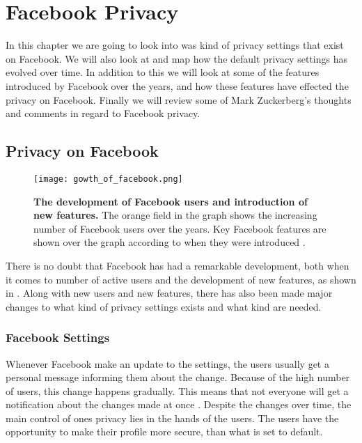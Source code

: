 \chapter{Facebook Privacy}
\label{chp:defaultprivacysettings} 

In this chapter we are going to look into was kind of privacy settings that exist on Facebook. We will also look at and map how the default privacy settings has evolved over time. In addition to this we will look at some of the features introduced by Facebook over the years, and how these features have effected the privacy on Facebook. Finally we will review some of Mark Zuckerberg's  thoughts and comments in regard to Facebook privacy. 


\section{Privacy on Facebook}\label{sec:privacy_on_facebook}

\begin{figure}[h!]
\centering
\texttt{[image: gowth\_of\_facebook.png]}
\caption[The development of Facebook users and introduction of new features]{\textbf{The development of Facebook users and introduction of new features.} The orange field in the graph shows the increasing number of Facebook users over the years. Key Facebook features are shown over the graph according to when they were introduced \cite{BBCFacebookGrowth}.} 
\label{fig:growth_of_facebook}
\end{figure}

There is no doubt that Facebook has had a remarkable development, both when it comes to number of active users and the development of new features, as shown in . Along with new users and new features, there has also been made major changes to what kind of privacy settings exists and what kind are needed. 


\subsection{Facebook Settings}
Whenever Facebook make an update to the settings, the users usually get a personal message informing them about the change. Because of the high number of users, this change happens gradually. This means that not everyone will get a notification about the changes made at once \cite{settingschangingagain}. Despite the changes over time, the main control of ones privacy lies in the hands of the users. The users have the opportunity to make their profile more secure, than what is set to default. 

